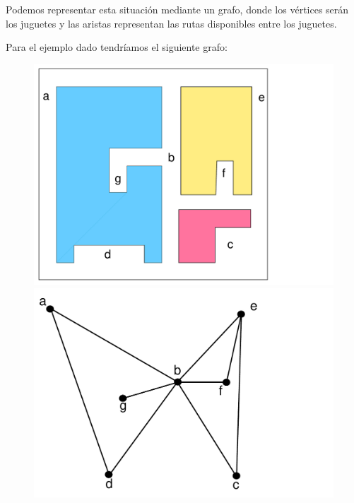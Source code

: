 \documentclass[twoside]{report}
\begin{document}
\vspace{0.5cm}
Podemos representar esta situación mediante un grafo, donde los vértices serán los juguetes y las aristas representan las rutas disponibles entre los juguetes.
\vspace{0.2cm}

Para el ejemplo dado tendríamos el siguiente grafo:

      \begin{center}
           \begin{figure}[h!]\centering
           \includegraphics[scale=0.15]{pdfs/B1.pdf}
           \includegraphics[scale=0.2]{pdfs/B2.pdf}
           \end{figure}
      \end{center}
\end{document}

